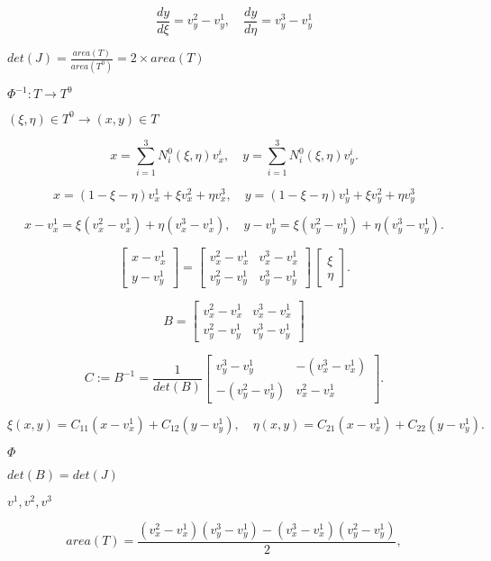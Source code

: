 \documentclass{article}
\begin{document}
\[ \frac{dy}{d\xi} = v^2_y - v^1_y, \quad \frac{dy}{d\eta} = v^3_y - v^1_y \]
\pagebreak

$ det(J) = \frac{area(T)}{area(T^0)} = 2\times area(T) $
\pagebreak

$ \Phi^{-1} : T \to T^9 $
\pagebreak

$ (\xi, \eta )\in T^0 \to (x,y) \in T $
\pagebreak

\[ x = \sum_{i=1}^3 N^0_i(\xi, \eta) v^i_x, \quad y = \sum_{i=1}^3 N^0_i(\xi, \eta) v^i_y. \]
\pagebreak

\[ x = (1 - \xi - \eta) v^1_x + \xi v^2_x + \eta v^3_x, \quad y = (1 - \xi - \eta) v^1_y + \xi v^2_y + \eta v^3_y \]
\pagebreak

\[ x - v^1_x = \xi (v^2_x - v^1_x) + \eta (v^3_x - v^1_x), \quad y - v^1_y = \xi (v^2_y - v^1_y) + \eta (v^3_y - v^1_y). \]
\pagebreak

\[ \left[ {\begin{array}{c} x - v^1_x \\ y - v^1_y \end{array}}\right] = \left[ {\begin{array}{cc} v^2_x - v^1_x & v^3_x - v^1_x \\ v^2_y - v^1_y & v^3_y - v^1_y \end{array}}\right] \, \left[ {\begin{array}{c} \xi \\ \eta \end{array}}\right]. \]
\pagebreak

\[ B = \left[ {\begin{array}{cc} v^2_x - v^1_x & v^3_x - v^1_x \\ v^2_y - v^1_y & v^3_y - v^1_y \end{array}}\right] \]
\pagebreak

\[ C := B^{-1} = \frac{1}{det(B)} \left[ {\begin{array}{cc} v^3_y - v^1_y & -(v^3_x - v^1_x) \\ -(v^2_y - v^1_y) & v^2_x - v^1_x \end{array}}\right]. \]
\pagebreak

\[ \xi(x,y) = C_{11} (x - v^1_x) + C_{12} (y - v^1_y), \quad \eta(x,y) = C_{21} (x - v^1_x) + C_{22} (y - v^1_y). \]
\pagebreak

$ \Phi$
\pagebreak

$ det(B) = det(J) $
\pagebreak

$ v^1, v^2, v^3 $
\pagebreak

\[ area(T) = \frac{(v^2_x - v^1_x) (v^3_y - v^1_y) - (v^3_x - v^1_x) (v^2_y - v^1_y)}{2}, \]
\pagebreak
\end{document}
